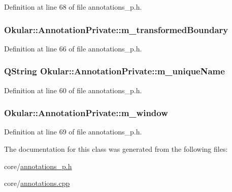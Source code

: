 Definition at line 68 of file annotations\+\_\+p.\+h.

\hypertarget{classOkular_1_1AnnotationPrivate_afb3198f13aa201601c71493bd2a32f63}{
\subsubsection[{m\+\_\+transformed\+Boundary}]{ Okular\+::\+Annotation\+Private\+::m\+\_\+transformed\+Boundary}}\label{classOkular_1_1AnnotationPrivate_afb3198f13aa201601c71493bd2a32f63}


Definition at line 66 of file annotations\+\_\+p.\+h.

\hypertarget{classOkular_1_1AnnotationPrivate_a31b33f971130850a5b5bf67ce58ae5f1}{
\subsubsection[{m\+\_\+unique\+Name}]{\setlength{\rightskip}{0pt plus 5cm}Q\+String Okular\+::\+Annotation\+Private\+::m\+\_\+unique\+Name}}\label{classOkular_1_1AnnotationPrivate_a31b33f971130850a5b5bf67ce58ae5f1}


Definition at line 60 of file annotations\+\_\+p.\+h.

\hypertarget{classOkular_1_1AnnotationPrivate_abcd3da119de1991beff85973cd951b64}{
\subsubsection[{m\+\_\+window}]{ Okular\+::\+Annotation\+Private\+::m\+\_\+window}}\label{classOkular_1_1AnnotationPrivate_abcd3da119de1991beff85973cd951b64}


Definition at line 69 of file annotations\+\_\+p.\+h.



The documentation for this class was generated from the following files\+:\begin{DoxyCompactItemize}
\item 
core/\hyperlink{annotations__p_8h}{annotations\+\_\+p.\+h}\item 
core/\hyperlink{annotations_8cpp}{annotations.\+cpp}\end{DoxyCompactItemize}
